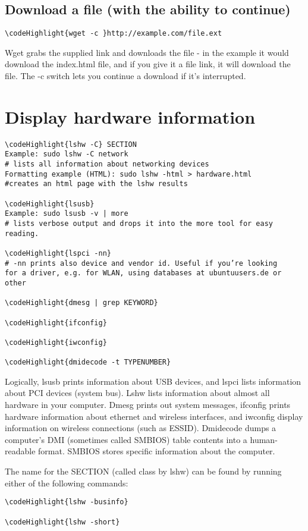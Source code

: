 \documentclass[12pt,a4paper]{article}
\begin{document}
\subsection{Download a file (with the ability to continue)}
\begin{Verbatim}[commandchars=\\\{\}]
\codeHighlight{wget -c }http://example.com/file.ext
\end{Verbatim}
Wget grabs the supplied link and downloads the file - in the example it would download the index.html file, and if you give it a file link, it will download the file.  The -c switch lets you continue a download if it's interrupted.

\section{Display hardware information}
\label{Display hardware information}
\begin{Verbatim}[commandchars=\\\{\}]
\codeHighlight{lshw -C} SECTION
Example: sudo lshw -C network
# lists all information about networking devices
Formatting example (HTML): sudo lshw -html > hardware.html
#creates an html page with the lshw results

\codeHighlight{lsusb}
Example: sudo lsusb -v | more
# lists verbose output and drops it into the more tool for easy reading.

\codeHighlight{lspci -nn}
# -nn prints also device and vendor id. Useful if you’re looking
for a driver, e.g. for WLAN, using databases at ubuntuusers.de or other

\codeHighlight{dmesg | grep KEYWORD}

\codeHighlight{ifconfig}

\codeHighlight{iwconfig}

\codeHighlight{dmidecode -t TYPENUMBER}
\end{Verbatim}
Logically, lsusb prints information about USB devices, and lspci lists information about PCI devices (system bus). Lshw lists information about almost all hardware in your computer. Dmesg prints out system messages, ifconfig prints hardware information about ethernet and wireless interfaces, and iwconfig display information on wireless connections (such as ESSID). Dmidecode dumps a computer's DMI (sometimes called SMBIOS) table contents into a human-readable format. SMBIOS stores specific information about the computer.

The name for the SECTION (called class by lshw) can be found by running either of the following commands:
\begin{Verbatim}[commandchars=\\\{\}]
\codeHighlight{lshw -businfo}

\codeHighlight{lshw -short}
\end{Verbatim}
\end{document}
